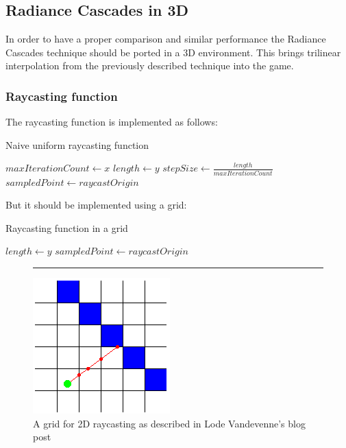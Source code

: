 \documentclass{rapportCS}
\begin{document}
\subsection{Radiance Cascades in 3D}
In order to have a proper comparison and similar performance the Radiance Cascades technique should be ported in a 3D environment. This brings trilinear interpolation from the previously described technique into the game.

\subsubsection{Raycasting function}
The raycasting function is implemented as follows:


\begin{algorithm}[hbt!]
\caption{Naive uniform raycasting function}\label{alg:two}
$maxIterationCount \gets x$\;
$length \gets y$\;
$stepSize \gets \frac{length}{maxIterationCount}$\;
$sampledPoint \gets raycastOrigin$\;
\end{algorithm}


But it should be implemented using a grid:


\begin{algorithm}[hbt!]
\caption{Raycasting function in a grid}\label{alg:two}
$length \gets y$\;
$sampledPoint \gets raycastOrigin$\;
\end{algorithm}

\begin{figure}
\centering
\rule{1cm}{1cm}
\includegraphics{figures/raycast_grid.png}
\caption{A grid for 2D raycasting as described in Lode Vandevenne’s blog post}
\end{figure}
\end{document}
